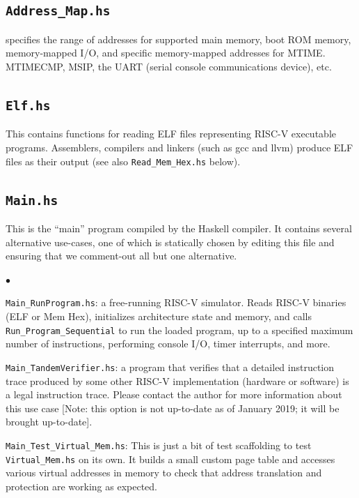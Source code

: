 \documentclass[11pt]{article}
\newenvironment{tightlist}%
{\begin{list}{$\bullet$}{%
    \setlength{\topsep}{0in}
    \setlength{\partopsep}{0in}
    \setlength{\itemsep}{0in}
    \setlength{\parsep}{0in}
    \setlength{\leftmargin}{1.5em}
    \setlength{\rightmargin}{0in}
    \setlength{\itemindent}{0in}
}
}%
{\end{list}
}
\begin{document}
\subsection{\tt Address\_Map.hs}

specifies the range of addresses for supported main memory, boot ROM
memory, memory-mapped I/O, and specific memory-mapped addresses for
MTIME. MTIMECMP, MSIP, the UART (serial console communications
device), etc.


\subsection{\tt Elf.hs}

This contains functions for reading ELF files representing RISC-V
executable programs.  Assemblers, compilers and linkers (such as gcc
and llvm) produce ELF files as their output (see also
\verb|Read_Mem_Hex.hs| below).


\subsection{\tt Main.hs}

This is the ``main'' program compiled by the Haskell compiler.  It
contains several alternative use-cases, one of which is statically
chosen by editing this file and ensuring that we comment-out all but
one alternative.

\begin{tightlist}

\item \verb|Main_RunProgram.hs|: a free-running RISC-V simulator.
Reads RISC-V binaries (ELF or Mem Hex), initializes architecture state
and memory, and calls \verb|Run_Program_Sequential| to run the loaded
program, up to a specified maximum number of instructions, performing
console I/O, timer interrupts, and more.

\item \verb|Main_TandemVerifier.hs|: a program that verifies that a
detailed instruction trace produced by some other RISC-V
implementation (hardware or software) is a legal instruction trace.
Please contact the author for more information about this use case
[Note: this option is not up-to-date as of January 2019; it will be
brought up-to-date].

\item \verb|Main_Test_Virtual_Mem.hs|: This is just a bit of test
scaffolding to test \verb|Virtual_Mem.hs| on its own.  It builds a
small custom page table and accesses various virtual addresses in
memory to check that address translation and protection are working as
expected.

\end{tightlist}
\end{document}
